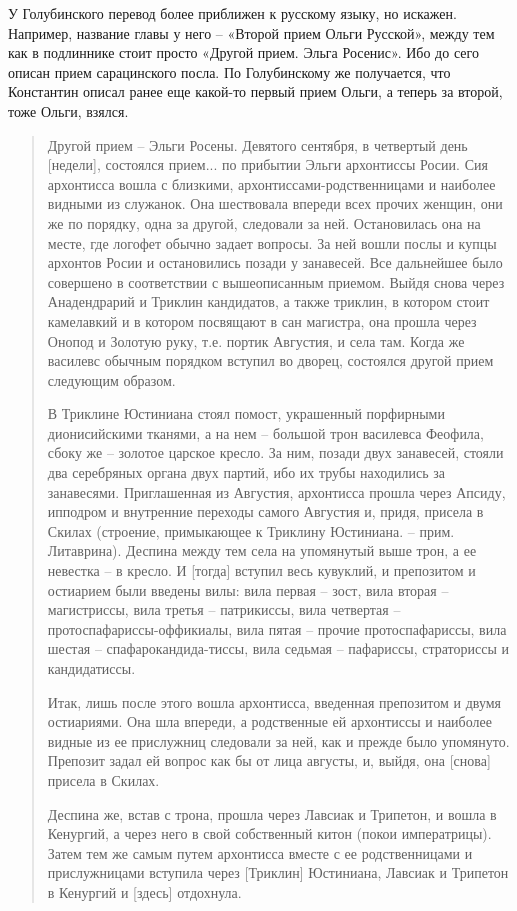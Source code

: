 У Голубинского перевод более приближен к русскому языку, но искажен. Например, название главы у него – «Второй прием Ольги Русской», между тем как в подлиннике стоит просто «Другой прием. Эльга Росенис». Ибо до сего описан прием сарацинского посла. По Голубинскому же получается, что Константин описал ранее еще какой-то первый прием Ольги, а теперь за второй, тоже Ольги, взялся.

\begin{quotation}
Другой прием – Эльги Росены. Девятого сентября, в четвертый день [недели], состоялся прием... по прибытии Эльги архонтиссы Росии. Сия архонтисса вошла с близкими, архонтисс\-ами-родственницами и наиболее видными из служанок. Она шествовала впереди всех прочих женщин, они же по порядку, одна за другой, следовали за ней. Остановилась она на месте, где логофет обычно задает вопросы. За ней вошли послы и купцы архонтов Росии и остановились позади у занавесей. Все дальнейшее было совершено в соответствии с вышеописанным приемом. Выйдя снова через Анадендрарий и Триклин кандидатов, а также триклин, в котором стоит камелавкий и в котором посвящают в сан магистра, она прошла через Онопод и Золотую руку, т.е. портик Августия, и села там. Когда же василевс обычным порядком вступил во дворец, состоялся другой прием следующим образом.

В Триклине Юстиниана стоял помост, украшенный порфирными дионисийскими тканями, а на нем – большой трон василевса Феофила, сбоку же – золотое царское кресло. За ним, позади двух занавесей, стояли два серебряных органа двух партий, ибо их трубы находились за занавесями. Приглашенная из Августия, архонтисса прошла через Апсиду, ипподром и внутренние переходы самого Августия и, придя, присела в Скилах (строение, примыкающее к Триклину Юстиниана. – прим. Литаврина). Деспина между тем села на упомянутый выше трон, а ее невестка – в кресло. И [тогда] вступил весь кувуклий, и препозитом и остиарием были введены вилы: вила первая – зост, вила вторая – магистриссы, вила третья – патрикиссы, вила четвертая – протоспафариссы-оффикиалы, вила пятая – прочие протоспафариссы, вила шестая – спафарокандида-тиссы, вила седьмая – пафариссы, страториссы и кандидатиссы.

Итак, лишь после этого вошла архонтисса, введенная препозитом и двумя остиариями. Она шла впереди, а родственные ей архонтиссы и наиболее видные из ее прислужниц следовали за ней, как и прежде было упомянуто. Препозит задал ей вопрос как бы от лица августы, и, выйдя, она [снова] присела в Скилах.

Деспина же, встав с трона, прошла через Лавсиак и Трипетон, и вошла в Кенургий, а через него в свой собственный китон (покои императрицы). Затем тем же самым путем архонтисса вместе с ее родственницами и прислужницами вступила через [Триклин] Юстиниана, Лавсиак и Трипетон в Кенургий и [здесь] отдохнула.


\end{quotation}

